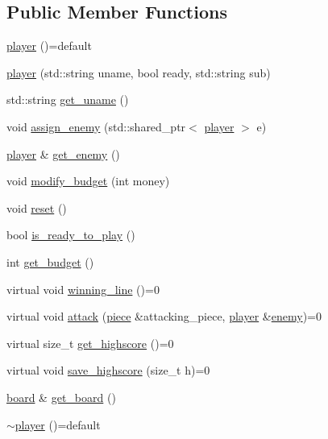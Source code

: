\subsection*{Public Member Functions}
\begin{DoxyCompactItemize}
\item 
\hyperlink{classbattle__ship_1_1player_a54df3c03653a24049b9629ce5c55fafa}{player} ()=default
\item 
\hyperlink{classbattle__ship_1_1player_a9c5da318ece63c6bdd3825cfa6ea9b4f}{player} (std\+::string uname, bool ready, std\+::string sub)
\item 
std\+::string \hyperlink{classbattle__ship_1_1player_a4a5406b436812664cb706c31b745239b}{get\+\_\+uname} ()
\item 
void \hyperlink{classbattle__ship_1_1player_a3525c2934ea6a4bd7600385cb5fa6bfa}{assign\+\_\+enemy} (std\+::shared\+\_\+ptr$<$ \hyperlink{classbattle__ship_1_1player}{player} $>$ e)
\item 
\hyperlink{classbattle__ship_1_1player}{player} \& \hyperlink{classbattle__ship_1_1player_a5224958feae654d622f56523dc45ab83}{get\+\_\+enemy} ()
\item 
void \hyperlink{classbattle__ship_1_1player_ade02279db7265558659c40f16c482df7}{modify\+\_\+budget} (int money)
\item 
void \hyperlink{classbattle__ship_1_1player_ae21fefa953f6a3a0476cabfae7084bbf}{reset} ()
\item 
bool \hyperlink{classbattle__ship_1_1player_af5373e08a637e9c21b3751eb02e07540}{is\+\_\+ready\+\_\+to\+\_\+play} ()
\item 
int \hyperlink{classbattle__ship_1_1player_ac2e25657d2330845c3770a75d107fef5}{get\+\_\+budget} ()
\item 
virtual void \hyperlink{classbattle__ship_1_1player_a3110ec708fd8fc7e02a6e88a63d57d2f}{winning\+\_\+line} ()=0
\item 
virtual void \hyperlink{classbattle__ship_1_1player_a86be2256620cd5e20da6db7be8afdbc8}{attack} (\hyperlink{classbattle__ship_1_1piece}{piece} \&attacking\+\_\+piece, \hyperlink{classbattle__ship_1_1player}{player} \&\hyperlink{classbattle__ship_1_1player_af01292346caaf209039b6490ae18d8aa}{enemy})=0
\item 
virtual size\+\_\+t \hyperlink{classbattle__ship_1_1player_a9b74e59f4b120d38ad591dba6a1d1ba7}{get\+\_\+highscore} ()=0
\item 
virtual void \hyperlink{classbattle__ship_1_1player_a928538249678aea5402f8c673671e995}{save\+\_\+highscore} (size\+\_\+t h)=0
\item 
\hyperlink{classbattle__ship_1_1board}{board} \& \hyperlink{classbattle__ship_1_1player_a57dacb55b2c506191d3d8426097c3c6a}{get\+\_\+board} ()
\item 
\hyperlink{classbattle__ship_1_1player_afbb6b6e880864bf7a36f21a95665a6c7}{$\sim$player} ()=default
\end{DoxyCompactItemize}

